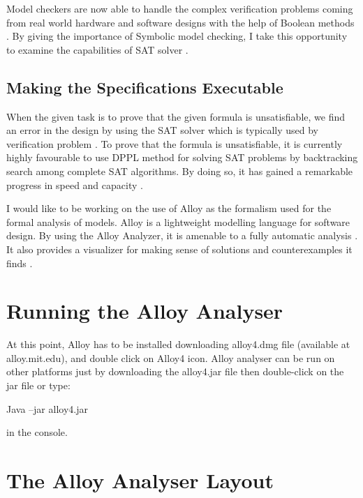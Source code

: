 \documentclass[a4paper,10pt]{report}
\begin{document}
Model checkers are now able to handle the complex verification problems coming from real world hardware and software designs with the help of Boolean methods \cite{ErichGamma1995}. By giving the importance of Symbolic model checking, I take this opportunity to examine the capabilities of SAT solver \cite{Bryant1986}.

\subsection{Making the Specifications Executable}
\label{Spec Exec}

When the given task is to prove that the given formula is unsatisfiable, we find an error in the design by using the SAT solver which is typically used by verification problem \cite{McMillan2003}. To prove that the formula is unsatisfiable, it is currently highly favourable to use DPPL method \cite{M.Davis1962} for solving SAT problems by backtracking search among complete SAT algorithms. By doing so, it has gained a remarkable progress in speed and capacity \cite{M.Moskewicz2001}.

I would like to be working on the use of Alloy as the formalism used for the formal analysis of models. Alloy is a lightweight modelling language for software design. By using the Alloy Analyzer, it is amenable to a fully automatic analysis \cite{D.Jackson}. It also provides a visualizer for making sense of solutions and counterexamples it finds \cite{P.Curson}.

\section{Running the Alloy Analyser}
\label{Run Alloy Analyzer}

At this point, Alloy has to be installed downloading alloy4.dmg file (available at alloy.mit.edu), and double click on Alloy4 icon. Alloy analyser can be run on other platforms just by downloading the alloy4.jar file then double-click on the jar file or type:

\begin{center}
Java –jar alloy4.jar
\end{center}

in the console.

\section{The Alloy Analyser Layout}
\label{Alloy Analyser layout}
\end{document}
